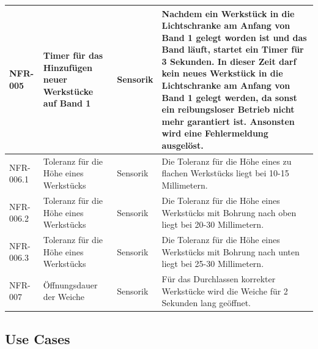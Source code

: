 \documentclass[oneside,a4paper,titlepage]{scrartcl} %
\begin{document}
\begin{small}
\begin{longtable}{|p{2cm}|p{4cm}|p{1.5cm}|p{5.5cm}|}
  \hline
  NFR-005 & Timer für das Hinzufügen neuer Werkstücke auf Band 1 & Sensorik & Nachdem ein Werkstück in die Lichtschranke am Anfang von Band 1 gelegt worden ist und das Band läuft, startet ein Timer für 3 Sekunden. In dieser Zeit darf kein neues Werkstück in die Lichtschranke am Anfang von Band 1 gelegt werden, da sonst ein reibungsloser Betrieb nicht mehr garantiert ist. Ansonsten wird eine Fehlermeldung ausgelöst.\\
  \hline
  \rowcolor{lightgray} NFR-006.1 & Toleranz für die Höhe eines Werkstücks & Sensorik & Die Toleranz für die Höhe eines zu flachen Werkstücks liegt bei 10-15 Millimetern.\\
  \hline
  \rowcolor{lightgray} NFR-006.2 & Toleranz für die Höhe eines Werkstücks & Sensorik & Die Toleranz für die Höhe eines Werkstücks mit Bohrung nach oben liegt bei 20-30 Millimetern.\\
  \hline
  \rowcolor{lightgray} NFR-006.3 & Toleranz für die Höhe eines Werkstücks & Sensorik & Die Toleranz für die Höhe eines Werkstücks mit Bohrung nach unten liegt bei 25-30 Millimetern.\\
  \hline
  NFR-007 & Öffnungsdauer der Weiche & Sensorik & Für das Durchlassen korrekter Werkstücke wird die Weiche für 2 Sekunden lang geöffnet.\\
  \hline
 \end{longtable}
\end{small}

\newpage

\subsection{Use Cases}
\end{document}
